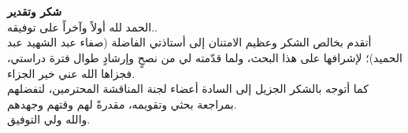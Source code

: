 \chapter*{}

\vfill
\begin{center}
	\amirifont\large
	\textbf{شكر وتقدير}\\[10pt]
	الحمد لله أولاً وآخراً على توفيقه..\\
	أتقدم بخالص الشكر وعظيم الامتنان إلى أستاذتي الفاضلة (صفاء عبد الشهيد عبد الحميد)؛ لإشرافها على هذا البحث، ولما قدّمته لي من نصحٍ وإرشادٍ طوال فترة دراستي، فجزاها الله عني خير الجزاء.\\
	كما أتوجه بالشكر الجزيل إلى السادة أعضاء لجنة المناقشة المحترمين، لتفضلهم بمراجعة بحثي وتقويمه، مقدرةً لهم وقتهم وجهدهم.\\
	والله ولي التوفيق.
\end{center}
\vfill